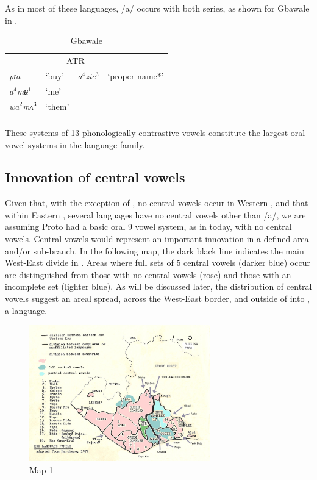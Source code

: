 \documentclass[output=paper,newtxmath,modfonts,nonflat]{langsci/langscibook}
\begin{document}
As in most of these languages, /a/ occurs with both series, as shown for Gbawale in . 

\begin{table}[h]
\caption{Gbawale \citep{Seri1987}}
\label{tab:zogbo:10}
\begin{tabular}{llll}
\lsptoprule
\multicolumn{2}{c}{−ATR} & \multicolumn{2}{c}{+ATR} \\

\textit{pɪa}  & ‘buy’ & \textit{a}$^4$\textit{zie}$^3$ & ‘proper name*’ \\ 

\textit{a}$^4$\textit{mʉ}$^1$ & ‘me’ \\

\textit{wa}$^2$\textit{mʌ}$^3$ & ‘them’ \\
\lspbottomrule
\end{tabular}
\end{table}

These systems of 13 phonologically contrastive vowels constitute the largest oral vowel systems in the  language family.  

\subsection{Innovation of central vowels}\label{sec:zogbo:2.1} 

Given that, with the exception of , no central vowels occur in Western , and that within Eastern , several languages have no central vowels other than /a/, we are assuming Proto  had a basic oral 9 vowel system, as in  today, with no central vowels.  Central vowels would represent an important innovation in a defined area and/or sub-branch.  In the following map, the dark black line indicates the main West-East divide in .  Areas where full sets of 5 central vowels (darker blue) occur are distinguished from those with no central vowels (rose) and those with an incomplete set (lighter blue). As will be discussed later, the distribution of central vowels suggest an areal spread, across the West-East border, and outside of  into , a  language.


\begin{figure}
\includegraphics[width=0.7\textwidth]{figures/fig-zogbo-1.png}
\caption{Map 1}
\label{fig:zogbo:1}
\end{figure} 
\end{document}
